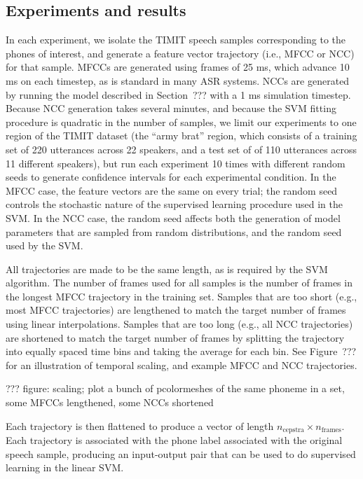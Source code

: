 \subsection{Experiments and results}

In each experiment,
we isolate the TIMIT speech samples
corresponding to the phones
of interest,
and generate a feature vector trajectory
(i.e., MFCC or NCC)
for that sample.
MFCCs are generated using frames
of 25 ms,
which advance 10 ms on each timestep,
as is standard in many ASR systems.
NCCs are generated
by running the model described in
Section~??? with a 1 ms simulation timestep.
Because NCC generation takes several minutes,
and because the SVM fitting procedure
is quadratic in the number of samples,
we limit our experiments to
one region of the TIMIT dataset
(the ``army brat'' region,
which consists of a training set
of 220 utterances across 22 speakers,
and a test set of of 110 utterances
across 11 different speakers),
but run each experiment
10 times with different random seeds
to generate confidence intervals
for each experimental condition.
In the MFCC case,
the feature vectors are the same
on every trial;
the random seed controls the
stochastic nature of
the supervised learning procedure
used in the SVM.
In the NCC case,
the random seed affects both
the generation of model parameters
that are sampled from random distributions,
and the random seed used by the SVM.

All trajectories are
made to be the same length,
as is required by the SVM algorithm.
The number of frames used
for all samples is
the number of frames in
the longest MFCC trajectory
in the training set.
Samples that are too short
(e.g., most MFCC trajectories)
are lengthened to match the
target number of frames
using linear interpolations.
Samples that are too long
(e.g., all NCC trajectories)
are shortened to match the
target number of frames
by splitting the trajectory
into equally spaced time bins
and taking the average
for each bin.
See Figure~??? for
an illustration of temporal scaling,
and example MFCC and NCC trajectories.

??? figure: scaling; plot a bunch of
pcolormeshes of the same phoneme
in a set, some MFCCs lengthened,
some NCCs shortened

Each trajectory is then flattened
to produce a vector of length
$n_{\text{cepstra}} \times n_{\text{frames}}$.
Each trajectory is associated with
the phone label associated with
the original speech sample,
producing an input-output pair
that can be used to do supervised learning
in the linear SVM.

